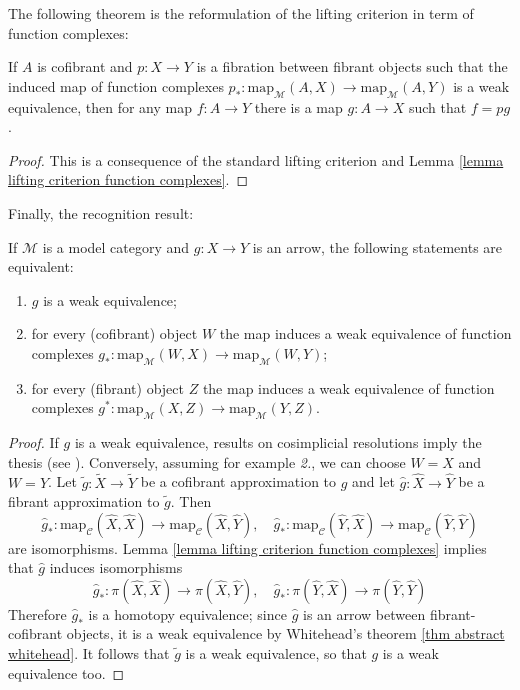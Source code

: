 The following theorem is the reformulation of the lifting criterion in term of function complexes:

\begin{thm} \label{thm lifting criterion function complexes}
If $A$ is cofibrant and $p \colon X \to Y$ is a fibration between fibrant objects such that the induced map of function complexes $p_* \colon \mathrm{map}_{\mathcal M}(A,X) \to \mathrm{map}_{\mathcal M}(A,Y)$ is a weak equivalence, then for any map $f \colon A \to Y$ there is a map $g \colon A \to X$ such that $f = pg$.
\end{thm}

\begin{proof}
This is a consequence of the standard lifting criterion and Lemma \ref{lemma lifting criterion function complexes}.
\end{proof}

Finally, the recognition result:

\begin{thm} \label{thm recognition via function complexes}
If $\mathcal M$ is a model category and $g \colon X \to Y$ is an arrow, the following statements are equivalent:
\begin{enumerate}
\item $g$ is a weak equivalence;
\item for every (cofibrant) object $W$ the map induces a weak equivalence of function complexes $g_* \colon \mathrm{map}_{\mathcal M}(W,X) \to \mathrm{map}_{\mathcal M}(W,Y)$;
\item for every (fibrant) object $Z$ the map induces a weak equivalence of function complexes $g^* \colon \mathrm{map}_{\mathcal M}(X,Z) \to \mathrm{map}_{\mathcal M}(Y,Z)$.
\end{enumerate}
\end{thm}

\begin{proof}
If $g$ is a weak equivalence, results on cosimplicial resolutions imply the thesis (see \cite[Theorem 17.6.3]{hirschhorn}). Conversely, assuming for example \emph{2.}, we can choose $W = X$ and $W = Y$. Let $\widetilde{g} \colon \widetilde{X} \to \widetilde{Y}$ be a cofibrant approximation to $g$ and let $\widehat{g} \colon \widehat{X} \to \widehat{Y}$ be a fibrant approximation to $\widetilde{g}$. Then
\[
\widehat{g}_* \colon \mathrm{map}_{\mathcal C}(\widehat{X},\widehat{X}) \to \mathrm{map}_{\mathcal C}(\widehat{X}, \widehat{Y}), \quad \widehat{g}_* \colon \mathrm{map}_{\mathcal C}(\widehat{Y},\widehat{X}) \to \mathrm{map}_{\mathcal C}(\widehat{Y},\widehat{Y})
\]
are isomorphisms. Lemma \ref{lemma lifting criterion function complexes} implies that $\widehat{g}$ induces isomorphisms
\[
\widehat{g}_* \colon \pi(\widehat{X},\widehat{X}) \to \pi(\widehat{X},\widehat{Y}), \quad \widehat{g}_* \colon \pi(\widehat{Y},\widehat{X}) \to \pi(\widehat{Y},\widehat{Y})
\]
Therefore $\widehat{g}_*$ is a homotopy equivalence; since $\widehat{g}$ is an arrow between fibrant-cofibrant objects, it is a weak equivalence by Whitehead's theorem \ref{thm abstract whitehead}. It follows that $\widetilde{g}$ is a weak equivalence, so that $g$ is a weak equivalence too.
\end{proof}


